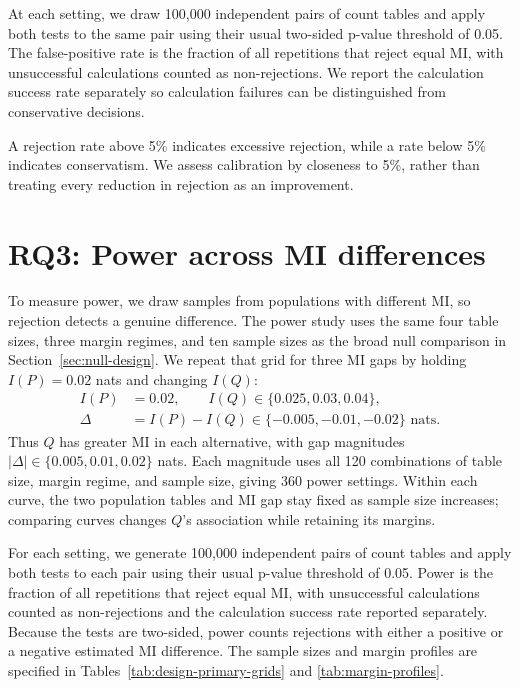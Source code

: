 At each setting, we draw 100,000 independent pairs of count tables and
apply both tests to the same pair using their usual two-sided p-value
threshold of 0.05. The false-positive rate is the fraction of all
repetitions that reject equal MI, with unsuccessful calculations counted as
non-rejections. We report the calculation success rate separately so
calculation failures can be distinguished from conservative decisions.

A rejection rate above 5\% indicates excessive rejection, while a rate
below 5\% indicates conservatism. We assess calibration by closeness to
5\%, rather than treating every reduction in rejection as an improvement.

\section{RQ3: Power across MI differences}
\label{sec:mi-gap-power-design}

To measure power, we draw samples from populations with different MI, so
rejection detects a genuine difference. The power study uses the same
four table sizes, three margin regimes, and ten sample sizes as the broad
null comparison in Section~\ref{sec:null-design}. We repeat that grid for
three MI gaps by holding \(I(P)=0.02\) nats and changing \(I(Q)\):
\begin{equation}
\begin{aligned}
 I(P)&=0.02,\qquad I(Q)\in\{0.025,0.03,0.04\},\\
 \Delta&=I(P)-I(Q)\in\{-0.005,-0.01,-0.02\}\text{ nats}.
\end{aligned}
 \label{eq:design-mi-gap-populations}
\end{equation}
Thus \(Q\) has greater MI in each alternative, with gap magnitudes
\(|\Delta|\in\{0.005,0.01,0.02\}\) nats. Each magnitude uses all
120 combinations of table size, margin regime, and sample size, giving
360 power settings. Within each curve, the two population tables and
MI gap stay fixed as sample size increases; comparing curves changes
\(Q\)'s association while retaining its margins.

For each setting, we generate 100,000 independent pairs of count tables
and apply both tests to each pair using their usual p-value threshold of
0.05. Power is the fraction of all repetitions that reject equal MI,
with unsuccessful calculations counted as non-rejections and the calculation
success rate reported separately. Because the tests are two-sided, power counts
rejections with either a positive or a negative estimated MI difference.
The sample sizes and margin profiles
are specified in Tables~\ref{tab:design-primary-grids} and
\ref{tab:margin-profiles}.

